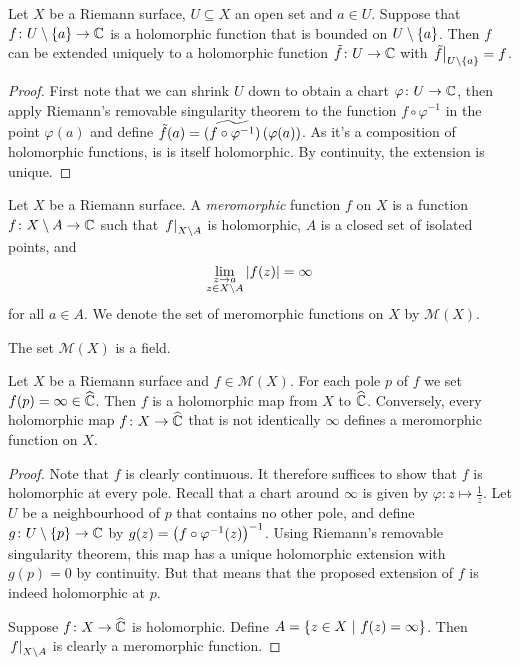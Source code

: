 \begin{izrek}
Let $X$ be a Riemann surface, $U \subseteq X$ an open set and
$a \in U$. Suppose that $f \colon U \setminus \left\{a\right\} \to \mathbb{C}$ is a
holomorphic function that is bounded on $U \setminus \left\{a\right\}$. Then
$f$ can be extended uniquely to a holomorphic function
$\tilde{f} \colon U \to \mathbb{C}$ with
$\left. \tilde{f}\right|_{U \setminus \left\{a\right\}}^{} = f$.
\end{izrek}

\begin{proof}
First note that we can shrink $U$ down to obtain a chart
$\varphi \colon U \to \mathbb{C}$, then apply Riemann's removable
singularity theorem to the function $f \circ \varphi^{-1}$ in the
point $\varphi(a)$ and define
$\tilde{f}(a) =
\widetilde{\left(f \circ \varphi^{-1}\right)} \left(\varphi(a)\right)$.
As it's a composition of holomorphic functions, is is itself
holomorphic. By continuity, the extension is unique.
\end{proof}


\begin{definicija}
Let $X$ be a Riemann surface. A
\emph{meromorphic} function $f$ on $X$
is a function $f \colon X \setminus A \to \mathbb{C}$ such that
$\left. f\right|_{X \setminus A}^{}$ is holomorphic, $A$ is a closed set of
isolated points, and
\[
\lim_{\substack{z \to a \\ z \in X \setminus A}} \left\lvert f(z)\right\rvert =
\infty
\]
for all $a \in A$. We denote the set of meromorphic functions on
$X$ by $\mathcal{M}(X)$.
\end{definicija}

\begin{opomba}
The set $\mathcal{M}(X)$ is a field.
\end{opomba}

\begin{izrek}
Let $X$ be a Riemann surface and $f \in \mathcal{M}(X)$. For each
pole $p$ of $f$ we set $f(p) = \infty \in \widehat{\mathbb{C}}$. Then $f$ is a
holomorphic map from $X$ to $\widehat{\mathbb{C}}$. Conversely, every holomorphic
map $f \colon X \to \widehat{\mathbb{C}}$ that is not identically $\infty$ defines
a meromorphic function on $X$.
\end{izrek}

\begin{proof}
Note that $f$ is clearly continuous. It therefore suffices to show
that $f$ is holomorphic at every pole. Recall that a chart around
$\infty$ is given by $\varphi \colon z \mapsto \frac{1}{z}$.
Let $U$ be a neighbourhood of $p$ that contains no other pole, and
define $g \colon U \setminus \left\{p\right\} \to \mathbb{C}$ by
$g(z) = \left(f \circ \varphi^{-1}(z)\right)^{-1}$. Using Riemann's
removable singularity theorem, this map has a unique holomorphic
extension with $g(p) = 0$ by continuity. But that means that the
proposed extension of $f$ is indeed holomorphic at $p$.

Suppose $f \colon X \to \widehat{\mathbb{C}}$ is holomorphic. Define
$A = \left\{z \in X~\middle\vert~f(z) = \infty\right\}$. Then
$\left. f\right|_{X \setminus A}^{}$ is clearly a meromorphic function.
\end{proof}

